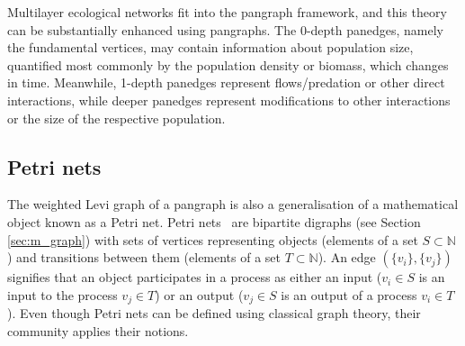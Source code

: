 \documentclass[a4paper,12pt]{article}
\theoremstyle{definition}
\theoremstyle{remark}
\begin{document}
Multilayer ecological networks fit into the pangraph framework, and this theory can be substantially enhanced using pangraphs. The 0-depth panedges, namely the fundamental vertices, may contain information about population size, quantified most commonly by the population density or biomass, which changes in time. Meanwhile, 1-depth panedges represent flows/predation or other direct interactions, while deeper panedges represent modifications to other interactions or the size of the respective population.
 
\subsection{Petri nets}\label{subsec:petri_nets}

The weighted Levi graph of a pangraph is also a generalisation of a mathematical object known as a Petri net. Petri nets~\cite{Petri_thesis, Petri_Peterson_book, Baez_open_petri_2017} are bipartite digraphs (see Section \ref{sec:m_graph}) with sets of vertices representing objects (elements of a set $S\subset \mathbb{N}$) and transitions between them (elements of a set $T\subset \mathbb{N}$). An edge $(\{v_i\},\{v_j\})$ signifies that an object participates in a process as either an input ($v_i\in S$ is an input to the process $v_j\in T$) or an output ($v_j\in S$ is an output of a process $v_i\in T$). Even though Petri nets can be defined using classical graph theory, their community applies their notions.
\end{document}
